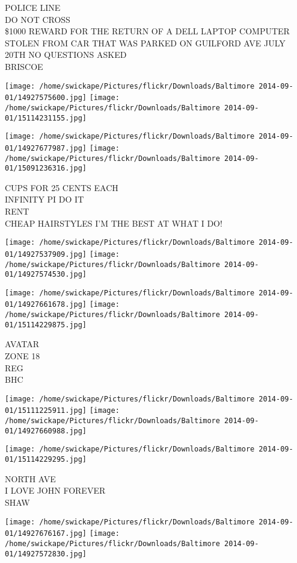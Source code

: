 \documentclass[10pt,letterpaper]{article}
\begin{document}
POLICE LINE\\
DO NOT CROSS\\
\$1000 REWARD FOR THE RETURN OF A DELL LAPTOP COMPUTER STOLEN FROM CAR THAT WAS PARKED ON GUILFORD AVE JULY 20TH NO QUESTIONS ASKED\\
BRISCOE
\pagebreak

\texttt{[image: /home/swickape/Pictures/flickr/Downloads/Baltimore 2014-09-01/14927575600.jpg]}
\texttt{[image: /home/swickape/Pictures/flickr/Downloads/Baltimore 2014-09-01/15114231155.jpg]}

\texttt{[image: /home/swickape/Pictures/flickr/Downloads/Baltimore 2014-09-01/14927677987.jpg]}
\texttt{[image: /home/swickape/Pictures/flickr/Downloads/Baltimore 2014-09-01/15091236316.jpg]}

CUPS FOR 25 CENTS EACH\\
INFINITY PI DO IT\\
RENT\\
CHEAP HAIRSTYLES I'M THE BEST AT WHAT I DO!
\pagebreak

\texttt{[image: /home/swickape/Pictures/flickr/Downloads/Baltimore 2014-09-01/14927537909.jpg]}
\texttt{[image: /home/swickape/Pictures/flickr/Downloads/Baltimore 2014-09-01/14927574530.jpg]}

\texttt{[image: /home/swickape/Pictures/flickr/Downloads/Baltimore 2014-09-01/14927661678.jpg]}
\texttt{[image: /home/swickape/Pictures/flickr/Downloads/Baltimore 2014-09-01/15114229875.jpg]}

AVATAR\\
ZONE 18\\
REG\\
BHC
\pagebreak

\texttt{[image: /home/swickape/Pictures/flickr/Downloads/Baltimore 2014-09-01/15111225911.jpg]}
\texttt{[image: /home/swickape/Pictures/flickr/Downloads/Baltimore 2014-09-01/14927660988.jpg]}

\vspace{0.25in}
\texttt{[image: /home/swickape/Pictures/flickr/Downloads/Baltimore 2014-09-01/15114229295.jpg]}

NORTH AVE\\
I LOVE JOHN FOREVER\\
SHAW
\pagebreak

\texttt{[image: /home/swickape/Pictures/flickr/Downloads/Baltimore 2014-09-01/14927676167.jpg]}
\texttt{[image: /home/swickape/Pictures/flickr/Downloads/Baltimore 2014-09-01/14927572830.jpg]}
\end{document}

